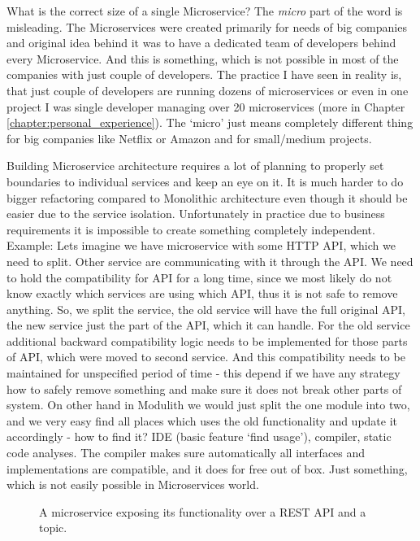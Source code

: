 What is the correct size of a single Microservice? The \textit{micro} part of the word is misleading. The Microservices were created primarily for needs of big companies and original idea behind it was to have a dedicated team of developers behind every Microservice. And this is something, which is not possible in most of the companies with just couple of developers. The practice I have seen in reality is, that just couple of developers are running dozens of microservices or even in one project I was single developer managing over 20 microservices (more in Chapter \ref{chapter:personal_experience}). The `micro' just means completely different thing for big companies like Netflix or Amazon and for small/medium projects.

Building Microservice architecture requires a lot of planning to properly set boundaries to individual services and keep an eye on it. It is much harder to do bigger refactoring compared to Monolithic architecture even though it should be easier due to the service isolation. Unfortunately in practice due to business requirements it is impossible to create something completely independent. Example: Lets imagine we have microservice with some HTTP API, which we need to split. Other service are communicating with it through the API. We need to hold the compatibility for API for a long time, since we most likely do not know exactly which services are using which API, thus it is not safe to remove anything. So, we split the service, the old service will have the full original API, the new service just the part of the API, which it can handle. For the old service additional backward compatibility logic needs to be implemented for those parts of API, which were moved to second service. And this compatibility needs to be maintained for unspecified period of time - this depend if we have any strategy how to safely remove something and make sure it does not break other parts of system. On other hand in Modulith we would just split the one module into two, and we very easy find all places which uses the old functionality and update it accordingly - how to find it? IDE (basic feature `find usage'), compiler, static code analyses. The compiler makes sure automatically all interfaces and implementations are compatible, and it does for free out of box. Just something, which is not easily possible in Microservices world.


\begin{figure}
    \centering
    
    \caption{A microservice exposing its functionality over a REST API and a topic. \cite{BUILDING_MS_WHAT_ARE}\label{img:microservices_basic}}
\end{figure}




